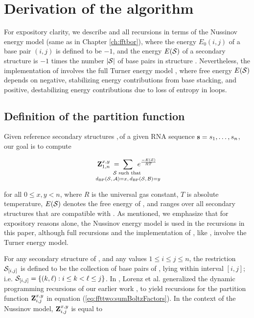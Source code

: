 \section{Derivation of the \ffttwo algorithm}
\label{sec:ffttwo:math}

For expository clarity, we describe \ffttwo and all recursions
in terms of the Nussinov energy model \cite{nussinovJacobson}
(same as in Chapter \ref{ch:fftbor}), where
the energy $E_0(i,j)$ of a base pair $(i,j)$ is defined to be $-1$, and the
energy $E(\mathcal S)$ of a secondary structure \str is $-1$ times the number $|\mathcal S|$
of base pairs in structure \str.  Nevertheless, the implementation of
\ffttwo involves the full Turner energy model \cite{xia:RNA}, where
free energy $E(\mathcal S)$ depends on negative, stabilizing energy contributions
from base stacking, and positive, destabilizing energy contributions due to
loss of entropy in loops.

\subsection{Definition of the partition function
\texorpdfstring{}{}}
\label{subsec:ffttwo:recursions}

Given reference secondary structures \strA,\,\strB of a
given RNA sequence ${\bf s}=s_1,\dots,s_n$, our goal is to compute

\begin{align}
\label{eq:ffttwo:sumBoltzFactors}
\bfZ{x,y}{1,n}\;=\;
\sum_{\mathclap{\substack{
\str \text{ such that } \rule[-.5ex]{0pt}{0pt} \\
\dBP{\str}{\strA} = x,\,\dBP{\str}{\strB} = y}}}\enspace
\boltzF{\str}
\end{align}

for all $0 \leq x,y < n$, where $R$ is the universal gas constant, $T$
is absolute temperature, $E(\mathcal S)$ denotes the free energy of \str,
and \str ranges
over all secondary structures that are compatible with \seq. As mentioned,
we emphasize that for expository reasons alone, the Nussinov energy model is
used in the recursions in this paper, although full recursions and
the implementation of \ffttwo, like \fftbor, involve the Turner energy model.

For any secondary structure \str of \seq, and any values
$1 \leq i \leq j \leq n$, the restriction $\mathcal S_{[i,j]}$ is defined to be the
collection of base pairs of \str, lying within interval $[i,j]$; i.e.
$\mathcal S_{[i,j]} = \{ (k, \ell) : i \leq k < \ell \leq j \}$.
In \cite{hofacker:RNAbor2D}, Lorenz et al. generalized
the dynamic programming recursions of our earlier work \cite{Freyhult.b07},
to yield recursions
for the partition function ${\bf Z}^{x,y}_{i,j}$ in equation
(\ref{eq:ffttwo:sumBoltzFactors}). In the context of the Nussinov model,
${\bf Z}^{x,y}_{i,j}$ is equal to

